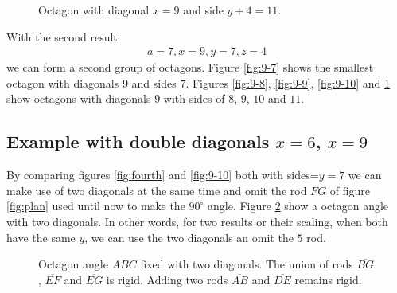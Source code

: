 \documentclass[11pt]{article}
\begin{document}
\begin{figure}
\centering
{}
\caption{Octagon with diagonal $x=9$ and side $y+4=11$.}
\label{fig:9-11}
\end{figure}

With the second result:
\begin{align*}
a=7, x=9, y=7, z=4
\end{align*}
we can form a second group of octagons.
Figure \ref{fig:9-7} shows the smallest octagon with diagonals $9$
and sides $7$. Figures \ref{fig:9-8}, \ref{fig:9-9}, \ref{fig:9-10} and \ref{fig:9-11} show octagons with diagonals $9$ with sides of $8$, $9$, $10$ and $11$.

\subsection{Example with double diagonals $x=6$, $x=9$}

By comparing figures \ref{fig:fourth} and \ref{fig:9-10} both with sides=$y=7$ we can 
make use of two diagonals at the same time and omit the rod $FG$ of figure \ref{fig:plan} used until now to make the $90^\circ{}$ angle. Figure \ref{fig:diags2} show a
octagon angle with two diagonals. In other words, for two results or their scaling,
when both have the same $y$, we can use the two diagonals an omit the $5$ rod.

\begin{figure}[H] %
\centering
{}
\caption{Octagon angle $ABC$ fixed with two diagonals.
The union of rods $\overline{BG}$, $\overline{EF}$ and $\overline{EG}$ is rigid.
Adding two rods $\overline{AB}$ and $\overline{DE}$ remains rigid.}
\label{fig:diags2}
\end{figure}
\end{document}
